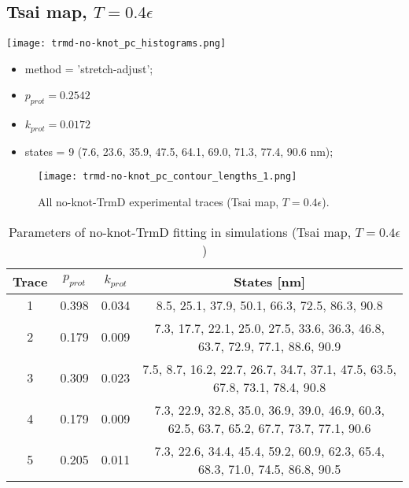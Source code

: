 \subsection{Tsai map, $T=0.4\epsilon$}
\label{subsec:no-knot-trmd-pc}
\begin{minipage}[c]{0.7\textwidth}
    \texttt{[image: trmd-no-knot\_pc\_histograms.png]}
\end{minipage}
\hfill
\begin{minipage}[c]{0.45\textwidth}
    \begin{itemize}
        \item method = 'stretch-adjust';
        \item $p_{prot}=0.2542$
        \item $k_{prot}=0.0172$
        \item states = 9 (7.6, 23.6, 35.9, 47.5, 64.1, 69.0, 71.3, 77.4, 90.6 nm);
    \end{itemize}
\end{minipage}

\begin{figure}
    \centering
    \texttt{[image: trmd-no-knot\_pc\_contour\_lengths\_1.png]}
    \caption{All no-knot-TrmD experimental traces (Tsai map, $T=0.4\epsilon$).}
    \label{fig:no-knot-trmd-pc-cl1}
\end{figure}

\begin{table}
    \tiny
    \centering
    \caption{Parameters of no-knot-TrmD fitting in simulations (Tsai map, $T=0.4\epsilon$)}
    \label{tab:no-knot-trmd-pc-parameters}
    \begin{tabular}{c|c|c|c}
        \textbf{Trace} & \textbf{$p_{prot}$} & \textbf{$k_{prot}$} & \textbf{States [nm]}\\\hline
        1 & 0.398 & 0.034 & 8.5, 25.1, 37.9, 50.1, 66.3, 72.5, 86.3, 90.8\\
        2 & 0.179 & 0.009 & 7.3, 17.7, 22.1, 25.0, 27.5, 33.6, 36.3, 46.8, 63.7, 72.9, 77.1, 88.6, 90.9\\
        3 & 0.309 & 0.023 & 7.5, 8.7, 16.2, 22.7, 26.7, 34.7, 37.1, 47.5, 63.5, 67.8, 73.1, 78.4, 90.8\\
        4 & 0.179 & 0.009 & 7.3, 22.9, 32.8, 35.0, 36.9, 39.0, 46.9, 60.3, 62.5, 63.7, 65.2, 67.7, 73.7, 77.1, 90.6\\
        5 & 0.205 & 0.011 & 7.3, 22.6, 34.4, 45.4, 59.2, 60.9, 62.3, 65.4, 68.3, 71.0, 74.5, 86.8, 90.5\\
    \end{tabular}
\end{table}

